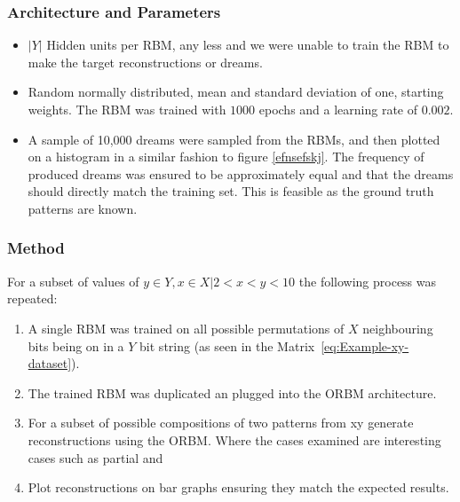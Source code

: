 \subsubsection{Architecture and Parameters}
\begin{itemize}
  \item $|Y|$ Hidden units per RBM, any less and we were unable to train the RBM to make the target reconstructions or dreams.
  \item Random normally distributed, mean and standard deviation of one, starting weights. The RBM was trained with $1000$ epochs and a learning rate of $0.002$.
  \item A sample of 10,000 dreams were sampled from the RBMs, and then plotted on a histogram in a similar fashion to figure \ref{efnsefskj}. The frequency of produced dreams was ensured to be approximately equal and that the dreams should directly match the training set. This is feasible as the ground truth patterns are known.
\end{itemize}


\subsubsection{Method}

For a subset of values of $y \in Y, x \in X | 2 < x < y < 10$ the following process was repeated:

\begin{enumerate}
  \item A single RBM was trained on all possible permutations of $X$ neighbouring bits being on in a $Y$ bit string (as seen in the Matrix~\ref{eq:Example-xy-dataset}).
  \item The trained RBM was duplicated an plugged into the ORBM architecture.
  \item For a subset of possible compositions of two patterns from xy  generate reconstructions using the ORBM. Where the cases examined are interesting cases such as partial and 
  \item Plot reconstructions on bar graphs ensuring they match the expected results.
\end{enumerate}

%

